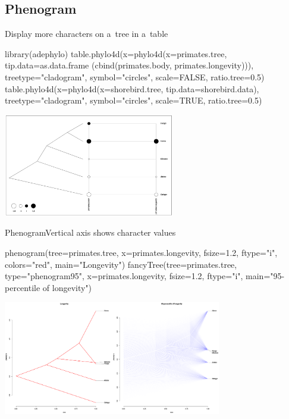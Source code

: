 \documentclass[compress, ucs, xelatex, 11pt, xcolor=svgnames,
  hyperref={
    bookmarks=true,
    unicode=true,
    colorlinks=true,
    pdftitle={Molecular data in R},
    plainpages=false,
    pdfauthor={Vojtech Zeisek},
    pdfsubject={Course about phylogeny and evolution in R},
    pdfcreator={XeLaTeX},
    pdfkeywords={R, evolution, phylogeny, molecular data},
    linkcolor=Tomato,
    anchorcolor=SaddleBrown,
    citecolor=Goldenrod,
    filecolor=DarkMagenta,
    menucolor=Sienna,
    urlcolor=DarkTurquoise,
    pdftex},
  url={hyphens, lowtilde} %
  ]{beamer}
\begin{document}
\subsection{Phenogram}

\begin{frame}[fragile]{Display more characters on a~tree in a~table}
  \begin{spluscode}
    library(adephylo)
    table.phylo4d(x=phylo4d(x=primates.tree, tip.data=as.data.frame
      (cbind(primates.body, primates.longevity))), treetype="cladogram",
      symbol="circles", scale=FALSE, ratio.tree=0.5)
    table.phylo4d(x=phylo4d(x=shorebird.tree, tip.data=shorebird.data),
      treetype="cladogram", symbol="circles", scale=TRUE, ratio.tree=0.5)
  \end{spluscode}
  \begin{center}
    \includegraphics[height=4.5cm]{phylotable.png}
  \end{center}
\end{frame}

\begin{frame}[fragile]{Phenogram}{Vertical axis shows character values}
  \begin{spluscode}
    phenogram(tree=primates.tree, x=primates.longevity, fsize=1.2,
      ftype="i", colors="red", main="Longevity")
    fancyTree(tree=primates.tree, type="phenogram95", x=primates.longevity,
      fsize=1.2, ftype="i", main="95-percentile of longevity")
  \end{spluscode}
  \begin{center}
    \includegraphics[height=5cm]{phenogram.png}
  \end{center}
\end{frame}
\end{document}
